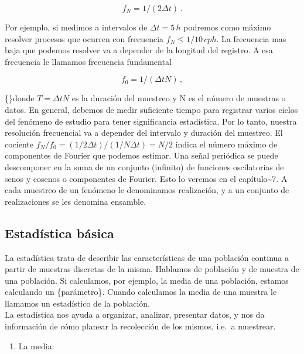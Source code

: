\documentclass[
]{agujournal2019}
\providecommand{\tightlist}{%
  \setlength{\itemsep}{0pt}\setlength{\parskip}{0pt}}\usepackage{longtable,booktabs,array}
\begin{document}
\[f_N=1/(2\Delta{t})\,.\]

Por ejemplo, si medimos a intervalos de \(\Delta{t}=5\,{ h}\) podremos
como máximo resolver procesos que ocurren con frecuencia
\(f_N\le1/10\,{ cph}\). La frecuencia mas baja que podemos resolver va a
depender de la longitud del registro. A esa frecuencia le llamamos
frecuencia fundamental

\[f_0=1/(\Delta{t}N)\,,\]

\{\noindent\}donde \(T=\Delta{t} N\) es la duración del muestreo y N es
el número de muestras o datos. En general, debemos de medir suficiente
tiempo para registrar varios ciclos del fenómeno de estudio para tener
significancia estadística. Por lo tanto, nuestra resolución frecuencial
va a depender del intervalo y duración del muestreo. El cociente
\(f_N/f_0=(1/2\Delta{t})/(1/N\Delta{t})=N/2\) indica el número máximo de
componentes de Fourier que podemos estimar. Una señal periódica se puede
descomponer en la suma de un conjunto (infinito) de funciones
oscilatorias de senos y cosenos o componentes de Fourier. Esto lo
veremos en el capítulo\textasciitilde7. A cada muestreo de un fenómeno
le denominamos realización, y a un conjunto de realizaciones se les
denomina ensamble.

\subsection{Estadística básica}\label{estaduxedstica-buxe1sica}

La estadística trata de describir las características de una población
continua a partir de muestras discretas de la misma. Hablamos de
población y de muestra de una población. Si calculamos, por ejemplo, la
media de una población, estamos calculando un \{parámetro\}. Cuando
calculamos la media de una muestra le llamamos un estadístico de la
población.\\

La estadística nos ayuda a organizar, analizar, presentar datos, y nos
da información de cómo planear la recolección de los mismos, i.e.~a
muestrear.

\begin{center}
\end{center}

\vspace{0.5cm}

\begin{enumerate}
\def\labelenumi{\arabic{enumi}.}
\tightlist
\item
  La media:\\
\end{enumerate}
\end{document}
